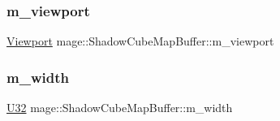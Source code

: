 \subsubsection{\texorpdfstring{m\+\_\+viewport}{m\_viewport}}
{\footnotesize\ttfamily \hyperlink{classmage_1_1_viewport}{Viewport} mage\+::\+Shadow\+Cube\+Map\+Buffer\+::m\+\_\+viewport\hspace{0.3cm}{\ttfamily [private]}}

\hypertarget{structmage_1_1_shadow_cube_map_buffer_a9492f3ff2146a03d30f3f02fd7985aba}{}\label{structmage_1_1_shadow_cube_map_buffer_a9492f3ff2146a03d30f3f02fd7985aba} 
\subsubsection{\texorpdfstring{m\+\_\+width}{m\_width}}
{\footnotesize\ttfamily \hyperlink{namespacemage_a41c104c036fba3756a74e19f793eeaa1}{U32} mage\+::\+Shadow\+Cube\+Map\+Buffer\+::m\+\_\+width\hspace{0.3cm}{\ttfamily [private]}}

